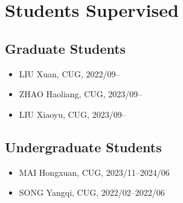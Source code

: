 \section{Students Supervised}

\subsection{Graduate Students}
\begin{itemize}
\item LIU Xuan, CUG, 2022/09--
\item ZHAO Haoliang, CUG, 2023/09--
\item LIU Xiaoyu, CUG, 2023/09--
\end{itemize}

\subsection{Undergraduate Students}
\begin{itemize}
\item MAI Hongxuan, CUG, 2023/11--2024/06
\item SONG Yangqi, CUG, 2022/02--2022/06
\end{itemize}
